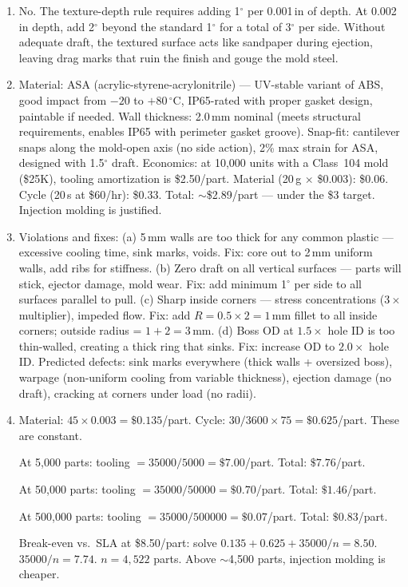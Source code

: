 \documentclass[11pt,letterpaper,twoside,openany]{book}
\newcommand{\degC}{\ensuremath{{}^{\circ}\text{C}}}
\providecommand{\ang}[1]{#1\ensuremath{{}^{\circ}}}
\begin{document}
\begin{enumerate}[leftmargin=1.5em]
  \item No. The texture-depth rule requires adding \ang{1} per 0.001\,in of depth. At 0.002\,in depth, add \ang{2} beyond the standard \ang{1} for a total of \ang{3} per side. Without adequate draft, the textured surface acts like sandpaper during ejection, leaving drag marks that ruin the finish and gouge the mold steel.

  \item Material: ASA (acrylic-styrene-acrylonitrile) --- UV-stable variant of ABS, good impact from $-20$ to $+80$\,\degC, IP65-rated with proper gasket design, paintable if needed. Wall thickness: 2.0\,mm nominal (meets structural requirements, enables IP65 with perimeter gasket groove). Snap-fit: cantilever snaps along the mold-open axis (no side action), 2\% max strain for ASA, designed with \ang{1.5} draft. Economics: at 10,000 units with a Class~104 mold (\$25K), tooling amortization is \$2.50/part. Material (20\,g $\times$ \$0.003): \$0.06. Cycle (20\,s at \$60/hr): \$0.33. Total: $\sim$\$2.89/part --- under the \$3 target. Injection molding is justified.

  \item Violations and fixes: (a) 5\,mm walls are too thick for any common plastic --- excessive cooling time, sink marks, voids. Fix: core out to 2\,mm uniform walls, add ribs for stiffness. (b) Zero draft on all vertical surfaces --- parts will stick, ejector damage, mold wear. Fix: add minimum \ang{1} per side to all surfaces parallel to pull. (c) Sharp inside corners --- stress concentrations ($3\times$ multiplier), impeded flow. Fix: add $R = 0.5 \times 2 = 1$\,mm fillet to all inside corners; outside radius = $1 + 2 = 3$\,mm. (d) Boss OD at $1.5\times$ hole ID is too thin-walled, creating a thick ring that sinks. Fix: increase OD to $2.0\times$ hole ID. Predicted defects: sink marks everywhere (thick walls + oversized boss), warpage (non-uniform cooling from variable thickness), ejection damage (no draft), cracking at corners under load (no radii).

  \item Material: $45 \times 0.003 = \$0.135$/part. Cycle: $30/3600 \times 75 = \$0.625$/part. These are constant.

  At 5,000 parts: tooling $= 35000/5000 = \$7.00$/part. Total: $\$7.76$/part.

  At 50,000 parts: tooling $= 35000/50000 = \$0.70$/part. Total: $\$1.46$/part.

  At 500,000 parts: tooling $= 35000/500000 = \$0.07$/part. Total: $\$0.83$/part.

  Break-even vs.\ SLA at \$8.50/part: solve $0.135 + 0.625 + 35000/n = 8.50$. $35000/n = 7.74$. $n = 4,522$ parts. Above $\sim$4,500 parts, injection molding is cheaper.
\end{enumerate}
\end{document}
